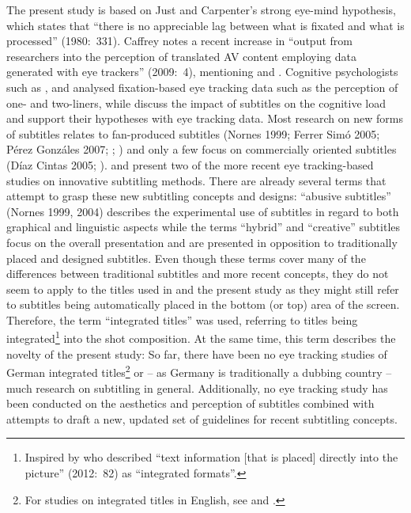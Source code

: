\documentclass[output=paper]{langsci/langscibook}
\begin{document}
The present study is based on Just and Carpenter's strong eye-mind hypothesis, which states that ``there is no appreciable lag between what is fixated and what is processed'' (1980:~331). Caffrey notes a recent increase in ``output from researchers into the perception of translated AV content employing data generated with eye trackers'' (2009:~4), mentioning \citet{moran2008} and \citet{delmissier2008}. Cognitive psychologists such as \citet{dydewalle1985}, \citet{koolstra1999lengthening} and \citet{Bruycker2007} analysed fixation-based eye tracking data such as the perception of one- and two-liners, while \citet{kruger2013} discuss the impact of subtitles on the cognitive load and support their hypotheses with eye tracking data. Most research on new forms of subtitles relates to fan-produced subtitles (Nornes 1999; Ferrer Simó 2005; Pérez Gonzáles 2007; \citealt{cintas2006}; \citealt{orrego2014}) and only a few focus on commercially oriented subtitles (Díaz Cintas 2005; \citealt{caffrey2009}). \citet{caffrey2009} and \citet{mcclarty2012, mcclarty2013a, mcclarty2013b} present two of the more recent eye tracking-based studies on innovative subtitling methods. There are already several terms that attempt to grasp these new subtitling concepts and designs: ``abusive subtitles'' (Nornes 1999, 2004) describes the experimental use of subtitles in regard to both graphical and linguistic aspects while the terms ``hybrid'' \citep{cintas2006} and ``creative'' \citep{mcclarty2012} subtitles focus on the overall presentation and are presented in opposition to traditionally placed and designed subtitles. Even though these terms cover many of the differences between traditional subtitles and more recent concepts, they do not seem to apply to the titles used in \citet{fox2012} and the present study as they might still refer to subtitles being automatically placed in the bottom (or top) area of the screen. Therefore, the term ``integrated titles'' \citep{fox2012} was used, referring to titles being integrated\footnote{Inspired by \citet{bayram2012} who described ``text information [that is placed] directly into the picture'' (2012:~82) as ``integrated formats''.
} into the shot composition. At the same time, this term describes the novelty of the present study: So far, there have been no eye tracking studies of German integrated titles\footnote{For studies on integrated titles in English, see \citet{mcclarty2013b} and \citet{brown2015}.
} or --  as Germany is traditionally a dubbing country -- much research on subtitling in general. Additionally, no eye tracking study has been conducted on the aesthetics and perception of subtitles combined with attempts to draft a new, updated set of guidelines for recent subtitling concepts.
\end{document}
